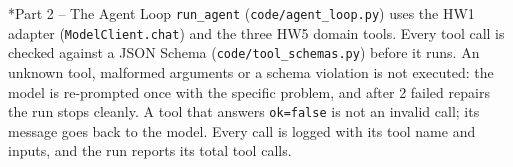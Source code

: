 \documentclass[11pt]{article}
\makeatletter
\renewcommand\section{\@startsection{section}{1}{\z@}{-3.0ex \@plus -1ex \@minus -.2ex}{1.2ex \@plus.2ex}{\normalfont\fontsize{14}{17}\selectfont\bfseries}}
\makeatother
\begin{document}
\section*{Part 2 -- The Agent Loop}
\texttt{run\_\allowbreak{}agent} (\texttt{code/\allowbreak{}agent\_\allowbreak{}loop.py}) uses the HW1 adapter (\texttt{ModelClient.chat}) and the three HW5 domain tools. Every tool call is checked against a JSON Schema (\texttt{code/\allowbreak{}tool\_\allowbreak{}schemas.py}) before it runs. An unknown tool, malformed arguments or a schema violation is not executed: the model is re-prompted once with the specific problem, and after 2 failed repairs the run stops cleanly. A tool that answers \texttt{ok=false} is not an invalid call; its message goes back to the model. Every call is logged with its tool name and inputs, and the run reports its total tool calls.
\end{document}
